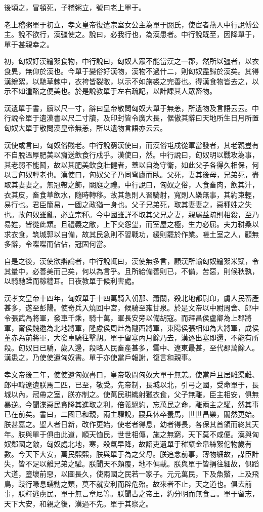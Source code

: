 後頃之，冒頓死，子稽粥立，號曰老上單于。

老上稽粥單于初立，孝文皇帝復遣宗室女公主為單于閼氏，使宦者燕人中行說傅公主。說不欲行，漢彊使之。說曰，必我行也，為漢患者。中行說既至，因降單于，單于甚親幸之。

初，匈奴好漢繒絮食物，中行說曰，匈奴人眾不能當漢之一郡，然所以彊者，以衣食異，無仰於漢也。今單于變俗好漢物，漢物不過什二，則匈奴盡歸於漢矣。其得漢繒絮，以馳草棘中，衣袴皆裂敝，以示不如旃裘之完善也。得漢食物皆去之，以示不如湩酪之便美也。於是說教單于左右疏記，以計課其人眾畜物。

漢遺單于書，牘以尺一寸，辭曰皇帝敬問匈奴大單于無恙，所遺物及言語云云。中行說令單于遺漢書以尺二寸牘，及印封皆令廣大長，倨傲其辭曰天地所生日月所置匈奴大單于敬問漢皇帝無恙，所以遺物言語亦云云。

漢使或言曰，匈奴俗賤老。中行說窮漢使曰，而漢俗屯戍從軍當發者，其老親豈有不自脫溫厚肥美以齎送飲食行戍乎。漢使曰，然。中行說曰，匈奴明以戰攻為事，其老弱不能鬬，故以其肥美飲食壯健者，蓋以自為守衛，如此父子各得久相保，何以言匈奴輕老也。漢使曰，匈奴父子乃同穹廬而臥。父死，妻其後母，兄弟死，盡取其妻妻之。無冠帶之飾，闕庭之禮。中行說曰，匈奴之俗，人食畜肉，飲其汁，衣其皮，畜食草飲水，隨時轉移。故其急則人習騎射，寬則人樂無事，其約束輕，易行也。君臣簡易，一國之政猶一身也。父子兄弟死，取其妻妻之，惡種姓之失也。故匈奴雖亂，必立宗種。今中國雖詳不取其父兄之妻，親屬益疏則相殺，至乃易姓，皆從此類。且禮義之敝，上下交怨望，而室屋之極，生力必屈。夫力耕桑以求衣食，筑城郭以自備，故其民急則不習戰功，緩則罷於作業。嗟土室之人，顧無多辭，令喋喋而佔佔，冠固何當。

自是之後，漢使欲辯論者，中行說輒曰，漢使無多言，顧漢所輸匈奴繒絮米糱，令其量中，必善美而己矣，何以為言乎。且所給備善則已，不備，苦惡，則候秋孰，以騎馳蹂而稼穡耳。日夜教單于候利害處。

漢孝文皇帝十四年，匈奴單于十四萬騎入朝那、蕭關，殺北地都尉卬，虜人民畜產甚多，遂至彭陽。使奇兵入燒回中宮，候騎至雍甘泉。於是文帝以中尉周舍、郎中令張武為將軍，發車千乘，騎十萬，軍長安旁以備胡寇。而拜昌侯盧卿為上郡將軍，甯侯魏遬為北地將軍，隆慮侯周灶為隴西將軍，東陽侯張相如為大將軍，成侯董赤為前將軍，大發車騎往擊胡。單于留塞內月餘乃去，漢逐出塞即還，不能有所殺。匈奴日已驕，歲入邊，殺略人民畜產甚多，雲中、遼東最甚，至代郡萬餘人。漢患之，乃使使遺匈奴書。單于亦使當戶報謝，復言和親事。

孝文帝後二年，使使遺匈奴書曰，皇帝敬問匈奴大單于無恙。使當戶且居雕渠難、郎中韓遼遺朕馬二匹，已至，敬受。先帝制，長城以北，引弓之國，受命單于，長城以內，冠帶之室，朕亦制之。使萬民耕織射獵衣食，父子無離，臣主相安，俱無暴逆。今聞渫惡民貪降其進取之利，倍義絕約，忘萬民之命，離兩主之驩，然其事已在前矣。書曰，二國已和親，兩主驩說，寢兵休卒養馬，世世昌樂，闟然更始。朕甚嘉之。聖人者日新，改作更始，使老者得息，幼者得長，各保其首領而終其天年。朕與單于俱由此道，順天恤民，世世相傳，施之無窮，天下莫不咸便。漢與匈奴鄰國之敵，匈奴處北地，寒，殺氣早降，故詔吏遺單于秫糱金帛絲絮佗物歲有數。今天下大安，萬民熙熙，朕與單于為之父母。朕追念前事，薄物細故，謀臣計失，皆不足以離兄弟之驩。朕聞天不頗覆，地不偏載。朕與單于皆捐往細故，俱蹈大道，墮壞前惡，以圖長久，使兩國之民若一家子。元元萬民，下及魚鱉，上及飛鳥，跂行喙息蠕動之類，莫不就安利而辟危殆。故來者不止，天之道也。俱去前事，朕釋逃虜民，單于無言章尼等。朕聞古之帝王，約分明而無食言。單于留志，天下大安，和親之後，漢過不先。單于其察之。

